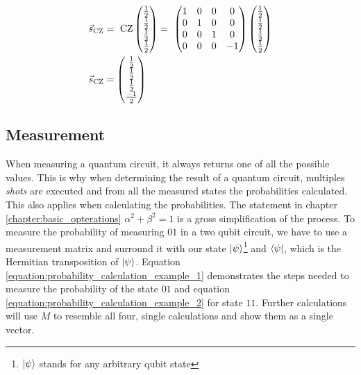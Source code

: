 \begin{equation}
    \centering
    \begin{split}
        \vec{s}_{\mathrm{CZ}} &=\ \mathrm{CZ}\begin{pmatrix}
            \frac{1}{2}\\\frac{1}{2}\\\frac{1}{2}\\\frac{1}{2}
        \end{pmatrix} =\  \begin{pmatrix}
        1 & 0 & 0 & 0 \\
        0 & 1 & 0 & 0 \\
        0 & 0 & 1 & 0 \\
        0 & 0 & 0 & -1
    \end{pmatrix}\begin{pmatrix}
            \frac{1}{2}\\\frac{1}{2}\\\frac{1}{2}\\\frac{1}{2}
        \end{pmatrix} \\
        \vec{s}_{\mathrm{CZ}} &= \begin{pmatrix}
            \frac{1}{2}\\\frac{1}{2}\\\frac{1}{2}\\\frac{-1}{2}
        \end{pmatrix}
    \end{split}
    \label{equation:cz_entanglement}
\end{equation}

\subsection{Measurement}
When measuring a quantum circuit, it always returns one of all the possible values. This is why when determining the result of a quantum circuit, multiples \emph{shots} are executed and from all the measured states the probabilities calculated. This also applies when calculating the probabilities. The statement in chapter \ref{chapter:basic_opterations} $\alpha^2 + \beta^2 = 1$ is a gross simplification of the process. To measure the probability of measuring $01$ in a two qubit circuit, we have to use a measurement matrix and surround it with our state $\ket{\psi}$\footnote{$\ket{\psi}$ stands for any arbitrary qubit state} and $\bra{\psi}$, which is the Hermitian transposition of $\ket{\psi}$. Equation \ref{equation:probability_calculation_example_1} demonstrates the steps needed to measure the probability of the state $01$ and equation \ref{equation:probability_calculation_example_2} for state $11$. Further calculations will use $M$ to resemble all four, single calculations and show them as a single vector.

